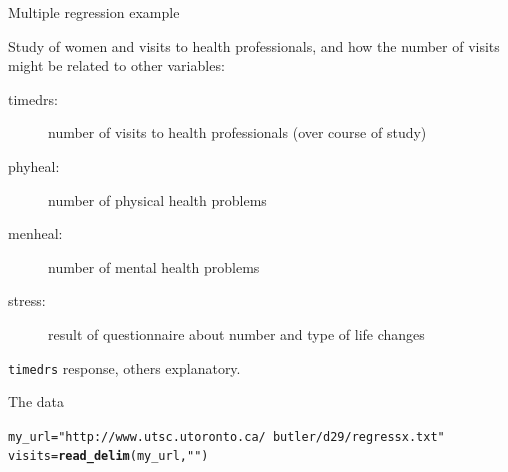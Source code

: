 \documentclass[unknownkeysallowed]{beamer}\usepackage[]{graphicx}\usepackage[]{color}
\makeatletter
\newcommand{\hlstr}[1]{\textcolor[rgb]{0.192,0.494,0.8}{#1}}%
\newcommand{\hlstd}[1]{\textcolor[rgb]{0.345,0.345,0.345}{#1}}%
\newcommand{\hlkwb}[1]{\textcolor[rgb]{0.69,0.353,0.396}{#1}}%
\newcommand{\hlkwd}[1]{\textcolor[rgb]{0.737,0.353,0.396}{\textbf{#1}}}%
\newenvironment{kframe}{%
 \def\at@end@of@kframe{}%
 \ifinner\ifhmode%
  \def\at@end@of@kframe{\end{minipage}}%
  \begin{minipage}{\columnwidth}%
 \fi\fi%
 \def\FrameCommand##1{\hskip\@totalleftmargin \hskip-\fboxsep
 \colorbox{shadecolor}{##1}\hskip-\fboxsep
     \hskip-\linewidth \hskip-\@totalleftmargin \hskip\columnwidth}%
 \MakeFramed {\advance\hsize-\width
   \@totalleftmargin\z@ \linewidth\hsize
   \@setminipage}}%
 {\par\unskip\endMakeFramed%
 \at@end@of@kframe}
\newenvironment{knitrout}{}{} %
\makeatother
\begin{document}
\begin{frame}[fragile]{Multiple regression example}

Study of women and visits to health professionals, and how the number of visits might be related to other variables:

\begin{description}
\item[timedrs:] number of visits to health professionals (over course of study)
\item[phyheal:] number of physical health problems
\item[menheal:] number of mental health problems
\item[stress:] result of questionnaire about number and type of life changes
\end{description}

\verb-timedrs- response, others explanatory.

\end{frame}

\begin{frame}[fragile]{The data}

 
\begin{knitrout}
\color{fgcolor}\begin{kframe}
\begin{alltt}
\hlstd{my_url}\hlkwb{=}\hlstr{"http://www.utsc.utoronto.ca/~butler/d29/regressx.txt"}
\hlstd{visits}\hlkwb{=}\hlkwd{read_delim}\hlstd{(my_url,}\hlstr{" "}\hlstd{)}
\end{alltt}


{\ttfamily\noindent\itshape\color{messagecolor}{\#\# Parsed with column specification:\\\#\# cols(\\\#\#\ \  subjno = col\_double(),\\\#\#\ \  timedrs = col\_double(),\\\#\#\ \  phyheal = col\_double(),\\\#\#\ \  menheal = col\_double(),\\\#\#\ \  stress = col\_double()\\\#\# )}}\end{kframe}
\end{knitrout}
  


\end{frame}
\end{document}
